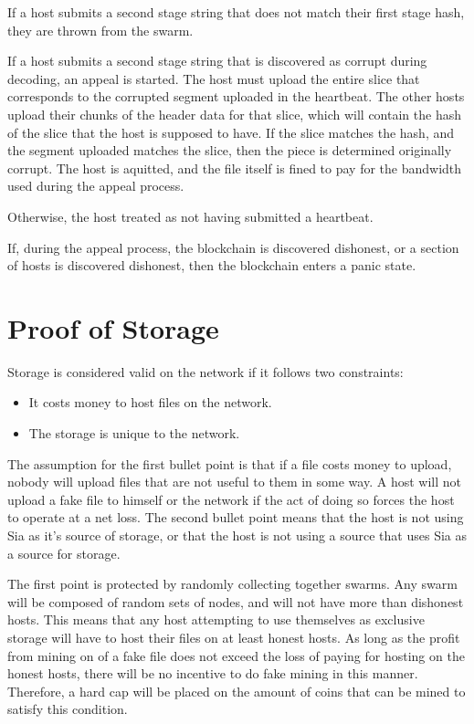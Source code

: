 \documentclass[twocolumn]{article}
\begin{document}
If a host submits a second stage string that does not match their first stage hash, they are thrown from the swarm.

If a host submits a second stage string that is discovered as corrupt during decoding, an appeal is started.
The host must upload the entire slice that corresponds to the corrupted segment uploaded in the heartbeat.
The other hosts upload their chunks of the header data for that slice, which will contain the hash of the slice that the host is supposed to have.
If the slice matches the hash, and the segment uploaded matches the slice, then the piece is determined originally corrupt.
The host is aquitted, and the file itself is fined to pay for the bandwidth used during the appeal process.

Otherwise, the host treated as not having submitted a heartbeat.

If, during the appeal process, the blockchain is discovered dishonest, or a section of hosts is discovered dishonest, then the blockchain enters a panic state.

\section{Proof of Storage}

Storage is considered valid on the network if it follows two constraints:

\begin{itemize}
	\item It costs money to host files on the network.
	\item The storage is unique to the network.
\end{itemize}

The assumption for the first bullet point is that if a file costs money to upload, nobody will upload files that are not useful to them in some way.
A host will not upload a fake file to himself or the network if the act of doing so forces the host to operate at a net loss.
The second bullet point means that the host is not using Sia as it's source of storage, or that the host is not using a source that uses Sia as a source for storage.

The first point is protected by randomly collecting together swarms.
Any swarm will be composed of random sets of nodes, and will not have more than \maxcorruption{} dishonest hosts.
This means that any host attempting to use themselves as exclusive storage will have to host their files on at least \inversemaxcorruption{} honest hosts.
As long as the profit from mining on \maxcorruption{} of a fake file does not exceed the loss of paying for hosting on the \inversemaxcorruption honest hosts, there will be no incentive to do fake mining in this manner.
Therefore, a hard cap will be placed on the amount of coins that can be mined to satisfy this condition.
\end{document}
